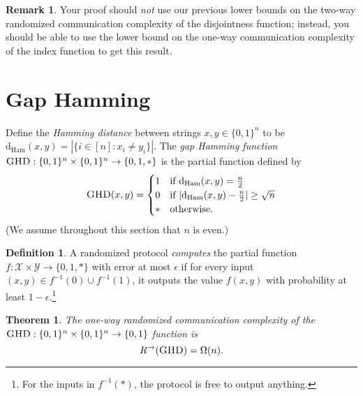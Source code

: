 \documentclass[11pt,oneside]{book}
\theoremstyle{plain}
\newtheorem{theorem}{Theorem}
\theoremstyle{definition}
\newtheorem{definition}{Definition}
\newtheorem{remark}{Remark}
\theoremstyle{plain}
\newcommand{\calX}{\mathcal{X}}
\newcommand{\calY}{\mathcal{Y}}
\newcommand{\dHam}{\mathrm{d}_{\mathrm{Ham}}}
\newcommand{\GHD}{\textsc{GHD}}
\begin{document}
\begin{remark}
	Your proof should \emph{not} use our previous lower bounds on the two-way randomized communication complexity of the disjointness function; instead, you should be able to use the lower bound on the one-way communication complexity of the index function to get this result.
\end{remark}



 
\section{Gap Hamming}

Define the \emph{Hamming distance} between strings $x,y \in \{0,1\}^n$ to be $\dHam(x,y) = |\{i \in [n] : x_i \neq y_i\}|$.
The \emph{gap Hamming function} $\GHD : \{0,1\}^n \times \{0,1\}^n \to \{0,1,*\}$ is the partial function defined by
\[
\GHD(x,y) = \begin{cases}
1 & \mbox{if } \dHam(x,y) = \frac n2 \\
0 & \mbox{if } |\dHam(x,y) - \frac n2| \ge \sqrt{n} \\
* & \mbox{otherwise.}
\end{cases}
\] 
(We assume throughout this section that $n$ is even.)

\begin{definition}
	A randomized protocol \emph{computes} the partial function $f : \calX \times \calY \to \{0,1,*\}$ with error at most $\epsilon$ if for every input $(x,y) \in f^{-1}(0) \cup f^{-1}(1)$, it outputs the value $f(x,y)$ with probability at least $1-\epsilon$.\footnote{For the inputs in $f^{-1}(*)$, the protocol is free to output anything.}
\end{definition}

\begin{theorem}
	The one-way randomized communication complexity of the $\GHD : \{0,1\}^n \times \{0,1\}^n \to \{0,1\}$ function is
	\[
	R^\rightarrow(\GHD) = \Omega(n).
	\]
\end{theorem}
\end{document}
